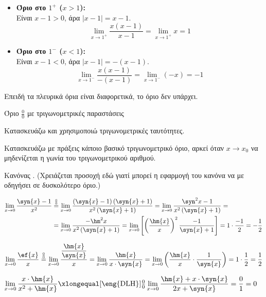 \begin{itemize}
    \item \textbf{Όριο στο $1^+$ ($x > 1$):}
    \\
    Είναι $x-1 > 0$, άρα $|x-1| = x-1$.
    \[ \lim\limits_{x\to 1^+} \dfrac{x(x-1)}{x-1} = \lim\limits_{x\to 1^+} x = {1} \]

    \item \textbf{Όριο στο $1^-$ ($x < 1$):}
    \\
    Είναι $x-1 < 0$, άρα $|x-1| = -(x-1)$.
    \[ \lim\limits_{x\to 1^-} \dfrac{x(x-1)}{-(x-1)} = \lim\limits_{x\to 1^-} (-x) = {-1} \]
\end{itemize}
Επειδή τα πλευρικά όρια είναι διαφορετικά, το όριο {δεν υπάρχει}.
\begin{askhsh}{Όριο $ \frac{0}{0} $ με τριγωνομετρικές παραστάσεις}
\begin{tropos}
\item Κατασκευάζω και χρησιμοποιώ τριγωνομετρικές ταυτότητες.
\item Κατασκευάζω με πράξεις κάποιο βασικό τριγωνομετρικό όριο, αρκεί όταν $ x\to x_0 $ να μηδενίζεται η γωνία του τριγωνομετρικού αριθμού.
\item Κανόνας . (Χρειάζεται προσοχή εδώ γιατί μπορεί η εφαρμογή του κανόνα να με οδηγήσει σε δυσκολότερο όριο.)
\end{tropos}
\end{askhsh}
\lysh
\vspace{-5mm}
\begin{alist}
\item $
\begin{aligned}[t]
\lim\limits_{x\to 0}{\dfrac{\syn{x}-1}{x^2}}&\stackrel{\frac{0}{0}}{=}\lim\limits_{x\to 0}{\dfrac{\left(\syn{x}-1\right)\left(\syn{x}+1\right)}{x^2\left(\syn{x}+1\right)}}=\lim\limits_{x\to 0}{\dfrac{\syn^2{x}-1}{x^2\left(\syn{x}+1\right)}}=\\&=\lim\limits_{x\to 0}{\dfrac{-\hm^2{x}}{x^2\left(\syn{x}+1\right)}}=\lim\limits_{x\to 0}{\left[\left(\dfrac{\hm{x}}{x}\right)^2\dfrac{-1}{\syn{x}+1}\right]}=1\cdot\dfrac{-1}{2}=-\dfrac{1}{2}
\end{aligned}
$
\item $\lim\limits_{x\to 0}{\dfrac{\ef{x}}{x}}\stackrel{\frac{0}{0}}{=}\lim\limits_{x\to 0}{\dfrac{\dfrac{\hm{x}}{\syn{x}}}{x}}=\lim\limits_{x\to 0}{\dfrac{\hm{x}}{x\cdot\syn{x}}}=\lim\limits_{x\to 0}{\left(\dfrac{\hm{x}}{x}\cdot\dfrac{1}{\syn{x}}\right)}=1\cdot\dfrac{1}{2}=\dfrac{1}{2}$
\item $\lim\limits_{x\to 0}{\dfrac{x\cdot\hm{x}}{x^2+\hm{x}}}\xlongequal[\text{\eng{DLH}}]{\frac{0}{0}}\lim\limits_{x\to 0}{\dfrac{\hm{x}+x\cdot\syn{x}}{2x+\syn{x}}}=\dfrac{0}{1}=0$
\end{alist}

